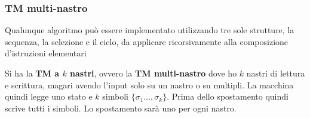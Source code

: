 \subsubsection{TM multi-nastro}
\begin{definizione}
  Qualunque algoritmo può essere implementato utilizzando tre sole strutture, la
  sequenza, la selezione e il ciclo, da applicare ricorsivamente alla
  composizione d'istruzioni elementari
\end{definizione}
\begin{definizione}
  Si ha la \textbf{TM a $k$ nastri}, ovvero la \textbf{TM
    multi-nastro} dove ho $k$ nastri di lettura e scrittura, magari avendo
  l'input solo su un nastro o su multipli. La macchina quindi legge uno stato e
  $k$ simboli $\{\sigma_1\ldots,\sigma_k\}$. Prima dello spostamento quindi
  scrive tutti i simboli. Lo spostamento sarà uno per ogni nastro.
\end{definizione}

